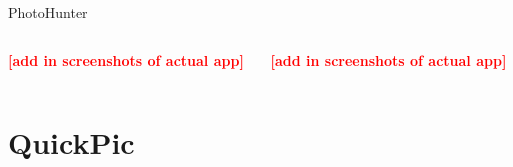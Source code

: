 \documentclass[aspectratio=169]{beamer}
\newcommand{\todo}[1]{\textcolor{red}{\textbf{[#1]}}}
\begin{document}
\begin{frame}{PhotoHunter}
  \begin{columns}[c]
    \begin{column}{0.5\columnwidth}
      \centering
			\todo{add in screenshots of actual app}
    \end{column}
    \begin{column}{0.5\columnwidth}
      \centering
			\todo{add in screenshots of actual app}
    \end{column}
  \end{columns}
\end{frame}

\section{QuickPic}
\end{document}
